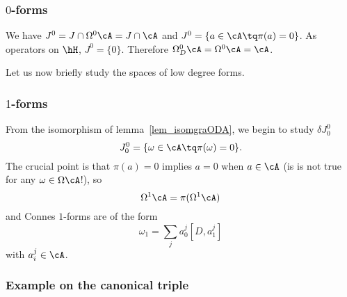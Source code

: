 \subsubsection{\texorpdfstring{$0$}{t}-forms}

We have $J^0=J\cap\Omega^0\cA=J\cap\cA$ and $J^0=\{ a\in\cA\tq \pi(a)=0 \}$. As operators on $\hH$, $J^0=\{ 0 \}$. Therefore $\Omega^0_D\cA=\Omega^0\cA=\cA$.

Let us now briefly study the spaces of low degree forms.

\subsubsection{\texorpdfstring{$1$}{1}-forms}

From the isomorphism of lemma~\ref{lem_isomgraODA}, we begin to study $\delta J_0^0$
\[
  J_0^0=\{ \omega\in\cA\tq\pi(\omega)=0 \}.
\]
The crucial point is that $\pi(a)=0$ implies $a=0$ when $a\in\cA$ (is is not true for any $\omega\in\Omega\cA$!), so
\begin{equation}
\Omega^1\cA=\pi(\Omega^1\cA)
\end{equation}
and Connes $1$-forms are of the form
\[
  \omega_1=\sum_ja_0^j[D,a_1^j]
\]
with $a_i^j\in\cA$.

\subsubsection{Example on the canonical triple}


